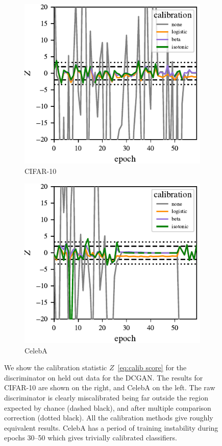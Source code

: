 \begin{figure}
    \centering
    \begin{subfigure}[b]{0.49\textwidth}
       \centering
       \includegraphics[scale=0.9]{figures/disc_calib_cifar.pdf}
       \caption{CIFAR-10}
       \label{fig:calibration cifar}
    \end{subfigure}
    \begin{subfigure}[b]{0.49\textwidth}
       \centering
       \includegraphics[scale=0.9]{figures/disc_calib_celeba.pdf}
       \caption{CelebA}
       \label{fig:calibration CelebA}
    \end{subfigure}
    \caption{{\small
    We show the calibration statistic $Z$~\eqref{eq:calib score} for the discriminator on held out data for the DCGAN\@.
    The results for CIFAR-10 are shown on the right, and CelebA on the left.
    The raw discriminator is clearly miscalibrated being far outside the region expected by chance (dashed black), and after multiple comparison correction (dotted black)\@.
    All the calibration methods give roughly equivalent results.
    CelebA has a period of training instability during epochs 30--50 which gives trivially calibrated classifiers.
    }}
    \label{fig:calibration}
\end{figure}


